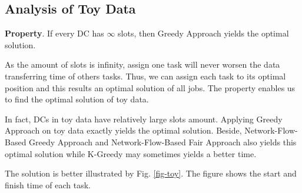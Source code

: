 \subsection{Analysis of Toy Data}\label{Toy Data}

\textbf{Property}. If every DC has $\infty$ slots, then Greedy Approach yields the optimal solution.

As the amount of slots is infinity, assign one task will never worsen the data transferring time of others tasks. Thus, we can assign each task to its optimal position and this results an optimal solution of all jobs. The property enables us to find the optimal solution of toy data. 

In fact, DCs in toy data have relatively large slots amount. Applying Greedy Approach on toy data exactly yields the optimal solution. Beside, Network-Flow-Based Greedy Approach and Network-Flow-Based Fair Approach also yields this optimal solution while K-Greedy may sometimes yields a better time.



The solution is better illustrated by Fig. \ref{fig-toy}. The figure shows the start and finish time of each task.
